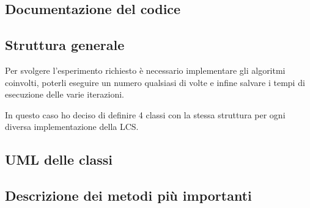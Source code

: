 \begin{ORANGEBOX}

	\section{Documentazione del codice}
	\subsection{Struttura generale}
	Per svolgere l'esperimento richiesto è necessario implementare gli algoritmi coinvolti, poterli eseguire un numero qualsiasi di volte e infine salvare i tempi di esecuzione delle varie iterazioni.
	
	In questo caso ho deciso di definire 4 classi con la stessa struttura per ogni diversa implementazione della LCS. 
	\subsection{UML delle classi}
	
	\subsection{Descrizione dei metodi più importanti}
\end{ORANGEBOX}



	
	
	

